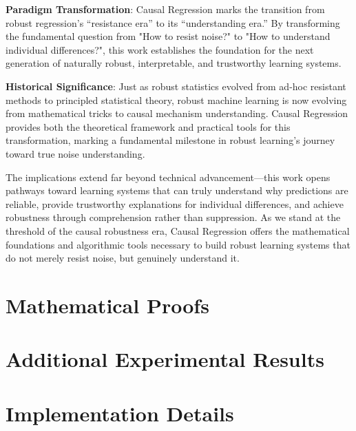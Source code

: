 \documentclass[conference]{IEEEtran}
\begin{document}
\textbf{Paradigm Transformation}: Causal Regression marks the transition from robust regression's ``resistance era'' to its ``understanding era.'' By transforming the fundamental question from "How to resist noise?" to "How to understand individual differences?", this work establishes the foundation for the next generation of naturally robust, interpretable, and trustworthy learning systems.

\textbf{Historical Significance}: Just as robust statistics evolved from ad-hoc resistant methods to principled statistical theory, robust machine learning is now evolving from mathematical tricks to causal mechanism understanding. Causal Regression provides both the theoretical framework and practical tools for this transformation, marking a fundamental milestone in robust learning's journey toward true noise understanding.

The implications extend far beyond technical advancement—this work opens pathways toward learning systems that can truly understand why predictions are reliable, provide trustworthy explanations for individual differences, and achieve robustness through comprehension rather than suppression. As we stand at the threshold of the causal robustness era, Causal Regression offers the mathematical foundations and algorithmic tools necessary to build robust learning systems that do not merely resist noise, but genuinely understand it.




\appendix

\section{Mathematical Proofs}
\label{app:proofs}


\section{Additional Experimental Results}
\label{app:results}


\section{Implementation Details}
\label{app:implementation}

\end{document}
